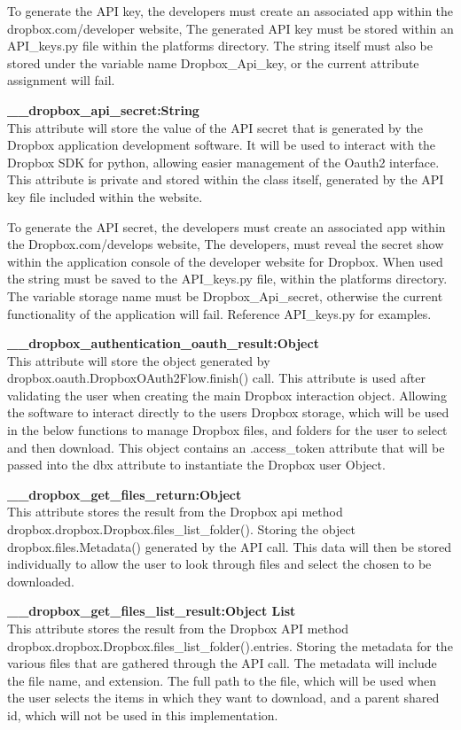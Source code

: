     To generate the API key, the developers must create an associated app within the dropbox.com/developer website,
    The generated API key must be stored within an API\_keys.py file within the platforms directory. The string itself
    must also be stored under the variable name Dropbox\_Api\_key, or the current attribute assignment will fail. 

\textbf{\_\_dropbox\_api\_secret:String} \\
    This attribute will store the value of the API secret that is generated by the Dropbox application development
    software. It will be used to interact with the Dropbox SDK for python, allowing easier management of the Oauth2
    interface. This attribute is private and stored within the class itself, generated by the API key file included 
    within the website.

    To generate the API secret, the developers must create an associated app within the Dropbox.com/develops website,
    The developers, must reveal the secret show within the application console of the developer website for Dropbox. When 
    used the string must be saved to the API\_keys.py file, within the platforms directory. The variable storage name must
    be Dropbox\_Api\_secret, otherwise the current functionality of the application will fail. Reference API\_keys.py for 
    examples. 

\textbf{\_\_dropbox\_authentication\_oauth\_result:Object} \\
    This attribute will store the object generated by dropbox.oauth.DropboxOAuth2Flow.finish() call. This attribute is used after validating
    the user when creating the main Dropbox interaction object. Allowing the software to interact directly to the users Dropbox storage, 
    which will be used in the below functions to manage Dropbox files, and folders for the user to select and then download. This object contains 
    an .access\_token attribute that will be passed into the dbx attribute to instantiate the Dropbox user Object.

\textbf{\_\_dropbox\_get\_files\_return:Object} \\
    This attribute stores the result from the Dropbox api method dropbox.dropbox.Dropbox.files\_list\_folder(). Storing the object 
    dropbox.files.Metadata() generated by the API call. This data will then be stored individually to allow the user to look through 
    files and select the chosen to be downloaded.

\textbf{\_\_dropbox\_get\_files\_list\_result:Object List} \\
    This attribute stores the result from the Dropbox API method dropbox.dropbox.Dropbox.files\_list\_folder().entries. Storing the metadata for 
    the various files that are gathered through the API call. The metadata will include the file name, and extension. The full path to the file, 
    which will be used when the user selects the items in which they want to download, and a parent shared id, which will not be used in this 
    implementation.

